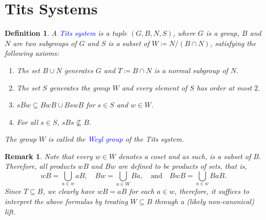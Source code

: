 \documentclass{article}
\theoremstyle{thmstyle}
\theoremstyle{defstyle}
\newtheorem{definition}[theorem]{Definition}
\newtheorem{remark}[theorem]{Remark}
\newcommand{\define}[1]{\textcolor{blue}{\textit{#1}}}
\begin{document}
\section{Tits Systems}

\begin{definition}
    A \define{Tits system} is a tuple $(G, B, N, S)$, where $G$ is a group, $B$ and $N$ are two subgroups of $G$ and $S$ is a subset of $W\coloneq N/(B\cap N)$, satisfying the following axioms: 
    \begin{enumerate}[label=(Tits \arabic*)]
        \item The set $B\cup N$ generates $G$ and $T\coloneq B\cap N$ is a normal subgroup of $N$. \label{tits1}
        \item The set $S$ generates the group $W$ and every element of $S$ has order at most $2$. \label{tits2}
        \item $sBw\subseteq BwB\cup BswB$ for $s\in S$ and $w\in W$. \label{tits3}
        \item For all $s\in S$, $sBs\not\subseteq B$. \label{tits4}
    \end{enumerate}
    The group $W$ is called the \define{Weyl group} of the Tits system.
\end{definition}

\begin{remark}
    Note that every $w\in W$ denotes a coset and as such, is a subset of $B$. Therefore, all products $wB$ and $Bw$ are defined to be products of sets, that is, 
    \begin{equation*}
        wB = \bigcup_{a\in w} aB,\quad Bw = \bigcup_{a\in W} Ba,\quad\text{and}\quad BwB = \bigcup_{a\in w} BaB.
    \end{equation*}
    Since $T\subseteq B$, we clearly have $wB = aB$ for each $a\in w$, therefore, it suffices to interpret the above formulas by treating $W\subseteq B$ through a (likely non-canonical) lift.
\end{remark}
\end{document}
